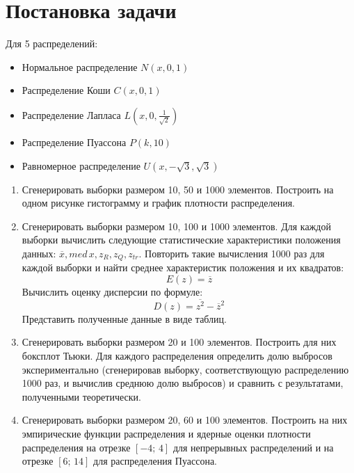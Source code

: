 \documentclass[a4paper]{article}
\begin{document}
    
    \tableofcontents
    \newpage
	\listoffigures
    \newpage
	\listoftables
    \newpage
\section {Постановка задачи}
	Для 5 распределений:
    \begin{itemize}
        \item Нормальное распределение $N(x, 0, 1)$
        \item Распределение Коши $C(x, 0, 1)$
        \item Распределение Лапласа $L\left(x, 0, \frac{1}{\sqrt{2}}\right)$
        \item Распределение Пуассона $P(k, 10)$
        \item Равномерное распределение $U\left(x,-\sqrt{3},\sqrt{3}\right)$
    \end{itemize}
	\begin{enumerate}
    	\item Сгенерировать выборки размером 10, 50 и 1000 элементов. Построить на одном рисунке гистограмму и график плотности распределения.
    	\item Сгенерировать выборки размером 10, 100 и 1000 элементов.
    	Для каждой выборки вычислить следующие статистические характеристики положения данных: $\overline{x}, med\,x, z_R, z_Q, z_{tr}$. Повторить такие вычисления 1000 раз для каждой выборки и найти среднее характеристик положения и их квадратов:
    	\begin{equation}\label{mean_formula}
        	E(z)=\overline{z}
    	\end{equation}
    	Вычислить оценку дисперсии по формуле:
    	\begin{equation}\label{variance_formula}
        	D(z)=\overline{z^2}-\overline{z}^2
    	\end{equation}
    	Представить полученные данные в виде таблиц.
		\item Сгенерировать выборки размером 20 и 100 элементов. Построить для них боксплот Тьюки. Для каждого распределения определить долю выбросов экспериментально (сгенерировав выборку, соответствующую распределению 1000 раз, и вычислив среднюю долю выбросов) и сравнить с результатами, полученными теоретически.
		\item Сгенерировать выборки размером 20, 60 и 100 элементов. Построить на них эмпирические функции распределения и ядерные оценки плотности распределения на отрезке $[-4;\,4]$ для непрерывных распределений и на отрезке $[6;\,14]$ для распределения Пуассона.
	\end{enumerate}
\end{document}
